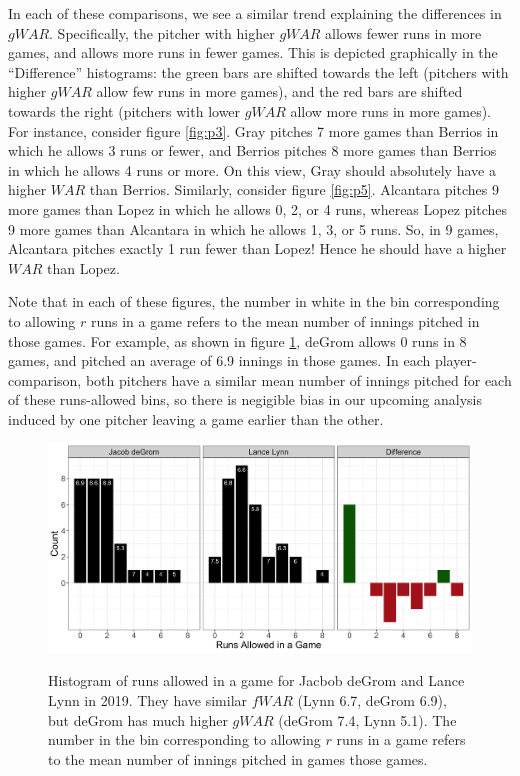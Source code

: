 \documentclass[12pt]{article}
\begin{document}
In each of these comparisons, we see a similar trend explaining the differences in $gWAR$. Specifically, the pitcher with higher $gWAR$ allows fewer runs in more games, and allows more runs in fewer games. This is depicted graphically in the ``Difference'' histograms: the green bars are shifted towards the left (pitchers with higher $gWAR$ allow few runs in more games), and the red bars are shifted towards the right (pitchers with lower $gWAR$ allow more runs in more games). For instance, consider figure \ref{fig:p3}. Gray pitches 7 more games than Berrios in which he allows 3 runs or fewer, and Berrios pitches 8 more games than Berrios in which he allows 4 runs or more. On this view, Gray should absolutely have a higher $WAR$ than Berrios. Similarly, consider figure \ref{fig:p5}. Alcantara pitches 9 more games than Lopez in which he allows 0, 2, or 4 runs, whereas Lopez pitches 9 more games than Alcantara in which he allows 1, 3, or 5 runs. So, in 9 games, Alcantara pitches exactly 1 run fewer than Lopez! Hence he should have a higher $WAR$ than Lopez. 

Note that in each of these figures, the number in white in the bin corresponding to allowing $r$ runs in a game refers to the mean number of innings pitched in those games. For example, as shown in figure \ref{fig:p2}, deGrom allows 0 runs in 8 games, and pitched an average of 6.9 innings in those games. In each player-comparison, both pitchers have a similar mean number of innings pitched for each of these runs-allowed bins, so there is negigible bias in our upcoming analysis induced by one pitcher leaving a game earlier than the other. 

\begin{figure}[t!]
\centering
\caption{Histogram of runs allowed in a game for Jacbob deGrom and Lance Lynn in 2019. They have similar $fWAR$ (Lynn 6.7, deGrom 6.9), but deGrom has much higher $gWAR$ (deGrom 7.4, Lynn 5.1). The number in the bin corresponding to allowing $r$ runs in a game refers to the mean number of innings pitched in games those games.} 
\includegraphics[width=15cm]{../writeup_plots/p2_2019.png}
\label{fig:p2}
\end{figure}
\end{document}
